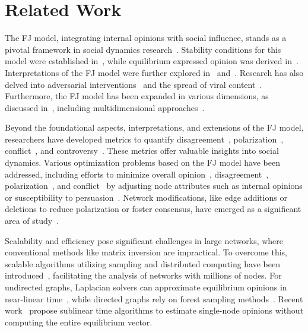 \section{Related Work}\label{sec:related}
The FJ model, integrating internal opinions with social influence, stands as a pivotal framework in social dynamics research~\cite{FrJo90}. Stability conditions for this model were established in~\cite{ravazzi2014ergodic}, while equilibrium expressed opinion was derived in~\cite{BiKlOr15,das2013debiasing}. Interpretations of the FJ model were further explored in~\cite{BiKlOr15} and~\cite{ghaderi2014opinion}. Research has also delved into adversarial interventions~\cite{chen2021adversarial,gaitonde2020adversarial,tu2023adversaries} and the spread of viral content~\cite{tu2022viral}. Furthermore, the FJ model has been expanded in various dimensions, as discussed in~\cite{jia2015opinion,semonsen2018opinion}, including multidimensional approaches~\cite{friedkin2016network,parsegov2016novel}.

Beyond the foundational aspects, interpretations, and extensions of the FJ model, researchers have developed metrics to quantify disagreement~\cite{musco2018minimizing}, polarization~\cite{matakos2017measuring,musco2018minimizing}, conflict~\cite{chen2018quantifying}, and controversy~\cite{chen2018quantifying}. These metrics offer valuable insights into social dynamics. Various optimization problems based on the FJ model have been addressed, including efforts to minimize overall opinion~\cite{sunOpinionOptimizationDirected2023}, disagreement~\cite{musco2018minimizing}, polarization~\cite{musco2018minimizing, matakos2017measuring}, and conflict~\cite{chen2018quantifying,zhu2022nearly} by adjusting node attributes such as internal opinions or susceptibility to persuasion~\cite{abebe2018opinion, gionis2013opinion,chan2019revisiting}. Network modifications, like edge additions or deletions to reduce polarization or foster consensus, have emerged as a significant area of study~\cite{zhu2021minimizing,musco2018minimizing, chen2018quantifying}.

Scalability and efficiency pose significant challenges in large networks, where conventional methods like matrix inversion are impractical. To overcome this, scalable algorithms utilizing sampling and distributed computing have been introduced~\cite{ravazzi2014ergodic, avena2018two}, facilitating the analysis of networks with millions of nodes. For undirected graphs, Laplacian solvers can approximate equilibrium opinions in near-linear time~\cite{xu2021fast}, while directed graphs rely on forest sampling methods~\cite{sunOpinionOptimizationDirected2023}. Recent work~\cite{neumann2024sublinear} propose sublinear time algorithms to estimate single-node opinions without computing the entire equilibrium vector.
